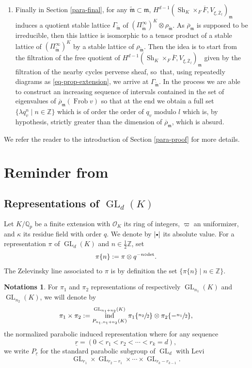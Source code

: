 \documentclass[JEP,XML,SOM,Unicode,published]{cedram}
\newcommand{\NoChangel}[1]{%
\expandafter\let\csname old\string#1\endcsname=#1
\let#1=\relax
\newcommand{#1}{\mathcode`l="716C\csname old\string#1\endcsname\mathcode`l="7160 }%
}
\let\sep\mid
\newcommand{\sbullet}{{\scriptscriptstyle\bullet}}
\newcommand{\csbullet}{{\raisebox{1pt}{$\sbullet$}}}
\DeclareMathOperator{\GL}{GL}
\theoremstyle{plain}
\theoremstyle{definition}
\newtheorem{notas}[equation]{Notations}
\numberwithin{equation}{subsection}
\newcommand\Qm{{\mathbb Q}}
\newcommand\Zm{{\mathbb Z}}
\newcommand\OC{{\mathcal O}}
\DeclareMathOperator{\sh}{Sh}
\DeclareMathOperator{\val}{val}\NoChangel{\val}
\DeclareMathOperator{\frob}{Frob}
\DeclareMathOperator{\ind}{ind}
\let \oo=\infty
\begin{document}
\begin{enumerate}
\item
Finally in Section \ref{para-final},
for any $\widetilde{\mathfrak m} \subset \mathfrak m$,
$H^{d-1}(\sh_K \times_F \overline F,V_{\xi,\overline \Zm_l})_{\mathfrak m}$
induces a quotient stable lattice $\Gamma_{\widetilde{\mathfrak m}}$ of $(\Pi_{\widetilde{\mathfrak m}}^{\oo})^K \otimes
\rho_{\widetilde{\mathfrak m}}$. As
$\overline \rho_{\mathfrak m}$ is supposed to be irreducible, then this
lattice is isomorphic to a tensor product of a stable lattice of
$(\Pi_{\widetilde{\mathfrak m}}^{\oo})^K$ by a stable lattice of
$\rho_{\widetilde{\mathfrak m}}$. Then the idea is to start from the filtration
of the free quotient of $H^{d-1}(\sh_K \times_F \overline F,
V_{\xi,\overline \Zm_l})_{\mathfrak m}$ given
by the filtration of the nearby cycles perverse sheaf, so~that, using repeatedly
diagrams as \eqref{eq-prop-extension}, we arrive at $\Gamma_{\widetilde{\mathfrak m}}$.
In the process we are able to construct an increasing sequence of intervals
contained in the set of eigenvalues of $\overline \rho_{\mathfrak m}(\frob v)$
so that at the end we obtain a full set $\{\lambda q_v^n \sep n \in \Zm\}$
which is of order the order of $q_v$ modulo $l$ which is, by hypothesis,
strictly greater than the dimension of $\overline \rho_{\mathfrak m}$, which is
absurd.
\end{enumerate}

We refer the reader to the introduction of Section \ref{para-proof} for more details.

\section{\texorpdfstring{Reminder from \cite{boyer-imj}}{R}}

\subsection{Representations of $\GL_d(K)$}
\label{para-gen}

Let $K/\Qm_p$ be a finite extension with $\OC_K$ its ring of integers,
$\varpi$ an uniformizer, and
$\kappa$ its residue field with order $q$.
We denote by $|\csbullet|$ its absolute value.
For a representation $\pi$ of $\GL_d(K)$ and $n \in \frac{1}{2} \Zm$, set
\[
\pi \{n\}:= \pi \otimes q^{-n \val \circ \det}.
\]
The Zelevinsky line associated to $\pi$ is by definition the set
$\{\pi \{n\}\sep n \in \Zm\}$.

\begin{notas} \label{nota-ind}
For $\pi_1$ and $\pi_2$ representations of respectively $\GL_{n_1}(K)$ and
$\GL_{n_2}(K)$, we will denote by
\[
\pi_1 \times \pi_2:=\ind_{P_{n_1,n_1+n_2}(K)}^{\GL_{n_1+n_2}(K)}
\pi_1 \{\sfrac{n_2}{2}\} \otimes \pi_2 \{-\sfrac{n_1}{2}\},
\]
the normalized parabolic induced representation where for any sequence
\[
\underline r=(0< r_1 < r_2 < \cdots < r_k=d),
\]
we write $P_{\underline r}$ for
the standard parabolic subgroup of $\GL_d$ with Levi
\[
\GL_{r_1} \times \GL_{r_2-r_1} \times \cdots \times \GL_{r_k-r_{k-1}}.
\]
\end{notas}
\end{document}
